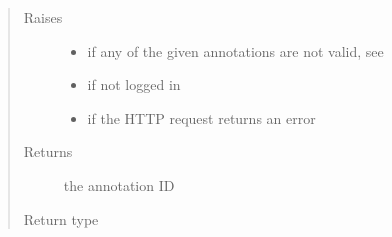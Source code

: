\documentclass[letterpaper,10pt,english]{sphinxmanual}
\begin{document}
\begin{fulllineitems}
\begin{fulllineitems}
\begin{quote}
\begin{description}
\item[{Raises}] \leavevmode\begin{itemize}
\item {} 
{\hyperref[\detokenize{autoapi/pine/client/exceptions/index:pine.client.exceptions.PineClientValueException}]{}} \textendash{} if any of the given annotations are not valid, see {\hyperref[\detokenize{autoapi/pine/client/models/index:pine.client.models.is_valid_annotation}]{}}

\item {} 
{\hyperref[\detokenize{autoapi/pine/client/exceptions/index:pine.client.exceptions.PineClientAuthException}]{}} \textendash{} if not logged in

\item {} 
{\hyperref[\detokenize{autoapi/pine/client/exceptions/index:pine.client.exceptions.PineClientHttpException}]{}} \textendash{} if the HTTP request returns an error

\end{itemize}

\item[{Returns}] \leavevmode
the annotation ID

\item[{Return type}] \leavevmode
{}

\end{description}\end{quote}

\end{fulllineitems}



\end{fulllineitems}
\end{document}
